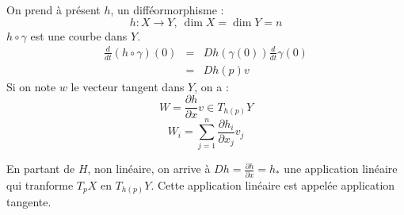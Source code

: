 On prend à présent $h$, un difféormorphisme :
	\[h:X\to Y,\ \dim X=\dim Y=n\]
$h\circ \gamma$ est une courbe dans $Y$.
\begin{eqnarray*}
	\frac{d}{dt}(h\circ \gamma)(0)&=&Dh(\gamma(0)) \frac{d}{dt}\gamma(0)\\
					&=& Dh(p) v
\end{eqnarray*}
Si on note $w$ le vecteur tangent dans $Y$, on a :
	\[W=\frac{\partial h}{\partial x} v \in T_{h(p)}Y\]
	\[W_i=\sum_{j=1}^n \frac{\partial h_i}{\partial x_j} v_j\]

En partant de $H$, non linéaire, on arrive à $Dh=\frac{\partial h}{\partial x}=h_*$ une application linéaire qui tranforme $T_pX$ en $T_{h(p)}Y$. Cette application linéaire est appelée application tangente.
